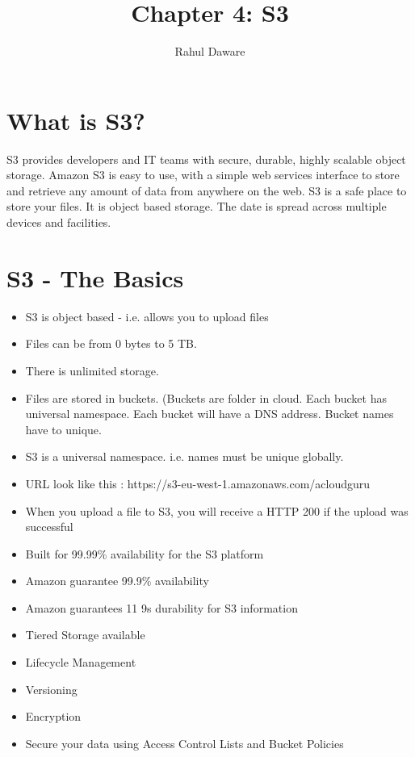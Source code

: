 \documentclass{report}
\author{Rahul Daware}
\begin{document}
\title{Chapter 4: S3}
\maketitle

\section*{What is S3?}
S3 provides developers and IT teams with secure, durable, highly scalable object storage. Amazon S3 is easy to use, with a simple web services interface to store and retrieve any amount of data from anywhere on the web. S3 is a safe place to store your files. It is object based storage. The date is spread across multiple devices and facilities.

\section*{S3 - The Basics}
\begin{itemize}
\item
S3 is object based - i.e. allows you to upload files

\item
Files can be from 0 bytes to 5 TB.

\item
There is unlimited storage.

\item
Files are stored in buckets. (Buckets are folder in cloud. Each bucket has universal namespace. Each bucket will have a DNS address. Bucket names have to unique.

\item
S3 is a universal namespace. i.e. names must be unique globally.

\item
URL look like this : https://s3-eu-west-1.amazonaws.com/acloudguru

\item
When you upload a file to S3, you will receive a HTTP 200 if the upload was successful

\item
Built for 99.99\% availability for the S3 platform

\item
Amazon guarantee 99.9\% availability

\item
Amazon guarantees 11 9s durability for S3 information

\item
Tiered Storage available

\item
Lifecycle Management

\item
Versioning

\item
Encryption

\item
Secure your data using Access Control Lists and Bucket Policies

\end{itemize}
\end{document}
